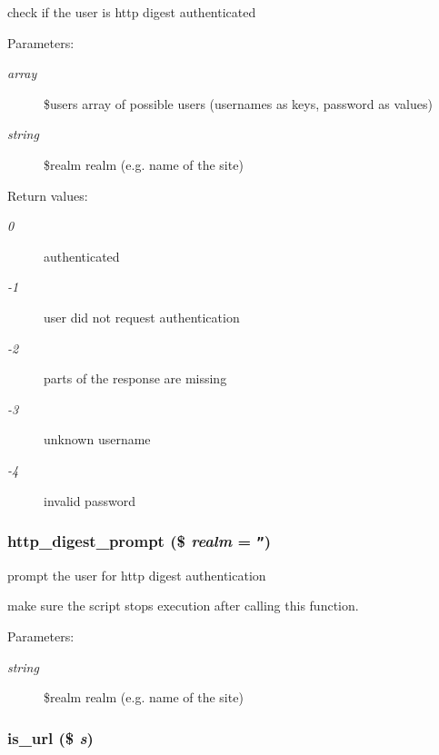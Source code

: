 check if the user is http digest authenticated

\begin{Desc}
\item[Parameters:]
\begin{description}
\item[{\em array}]\$users array of possible users (usernames as keys, password as values) \item[{\em string}]\$realm realm (e.g. name of the site) \end{description}
\end{Desc}
\begin{Desc}
\item[Return values:]
\begin{description}
\item[{\em 0}]authenticated \item[{\em -1}]user did not request authentication \item[{\em -2}]parts of the response are missing \item[{\em -3}]unknown username \item[{\em -4}]invalid password \end{description}
\end{Desc}
\hypertarget{util_8inc_8php_95d221746e2d296434b0d63f78cedf57}{
\subsubsection[{http\_\-digest\_\-prompt}]{\setlength{\rightskip}{0pt plus 5cm}http\_\-digest\_\-prompt (\$ {\em realm} = {\tt ''})}}
\label{util_8inc_8php_95d221746e2d296434b0d63f78cedf57}


prompt the user for http digest authentication

make sure the script stops execution after calling this function. \begin{Desc}
\item[Parameters:]
\begin{description}
\item[{\em string}]\$realm realm (e.g. name of the site) \end{description}
\end{Desc}
\hypertarget{util_8inc_8php_0da48011cb68c039aec396c23cb04295}{
\subsubsection[{is\_\-url}]{\setlength{\rightskip}{0pt plus 5cm}is\_\-url (\$ {\em s})}}
\label{util_8inc_8php_0da48011cb68c039aec396c23cb04295}


